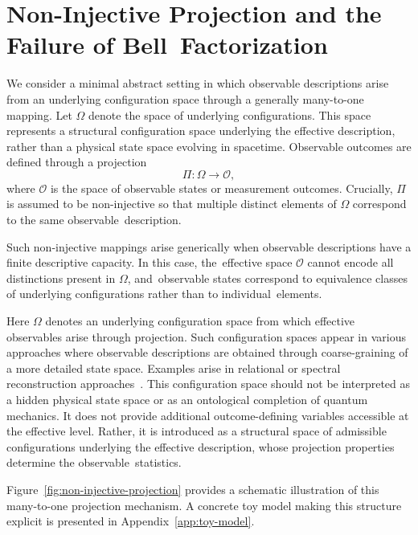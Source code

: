 \documentclass[quantumrep,article,accept,pdftex,oneauthor]{Definitions/mdpi}
\theoremstyle{remark}
\begin{document}
  \section{Non-Injective Projection and the Failure of Bell~Factorization}
    \label{sec:non-injective-projection}

    We consider a minimal abstract setting in which observable descriptions arise from
    an underlying configuration space through a generally many-to-one mapping.
    Let $\Omega$ denote the space of underlying configurations.
    This space represents a structural configuration space underlying the effective
    description, rather than a physical state space evolving in spacetime.
    Observable outcomes are defined through a projection
\begin{equation}
      \Pi : \Omega \rightarrow \mathcal{O},
    \end{equation}
    where $\mathcal{O}$ is the space of observable states or measurement outcomes.
    Crucially, $\Pi$ is assumed to be non-injective so that multiple distinct elements
    of $\Omega$ correspond to the same observable~description.

    Such non-injective mappings arise generically when observable descriptions have
    a finite descriptive capacity.
    In this case, the~effective space $\mathcal{O}$ cannot encode all distinctions
    present in $\Omega$, and~observable states correspond to equivalence classes
    of underlying configurations rather than to individual~elements.

    Here $\Omega$ denotes an underlying configuration space from which
    effective observables arise through projection.
    Such configuration spaces appear in various approaches where observable
    descriptions are obtained through coarse-graining of a more detailed state space.
    Examples arise in relational or spectral reconstruction approaches~\cite{Beau2026a}.
    This configuration space should not be interpreted as a hidden physical state space
    or as an ontological completion of quantum mechanics.
    It does not provide additional outcome-defining variables accessible at the effective level.
    Rather, it is introduced as a structural space of admissible configurations underlying
    the effective description, whose projection properties determine the observable~statistics.

    Figure~\ref{fig:non-injective-projection} provides a schematic illustration of this
    many-to-one projection mechanism.
    A concrete toy model making this structure explicit is presented in Appendix~\ref{app:toy-model}.
\end{document}
